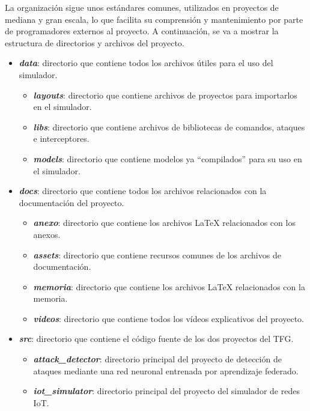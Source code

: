 La organización sigue unos estándares comunes, utilizados en proyectos de mediana y gran escala, lo que facilita su comprensión y mantenimiento por parte de programadores externos al proyecto. A continuación, se va a mostrar la estructura de directorios y archivos del proyecto.
\begin{itemize}
    \item \textit{\textbf{data}}: directorio que contiene todos los archivos útiles para el uso del simulador.
    \begin{itemize}
        \item \textit{\textbf{layouts}}: directorio que contiene archivos de proyectos para importarlos en el simulador. 
        \item \textit{\textbf{libs}}: directorio que contiene archivos de bibliotecas de comandos, ataques e interceptores.
        \item \textit{\textbf{models}}: directorio que contiene modelos ya ``compilados'' para su uso en el simulador.
    \end{itemize} 
    \item \textit{\textbf{docs}}: directorio que contiene todos los archivos relacionados con la documentación del proyecto.
    \begin{itemize}
        \item \textit{\textbf{anexo}}: directorio que contiene los archivos LaTeX relacionados con los anexos.
        \item \textit{\textbf{assets}}: directorio que contiene recursos comunes de los archivos de documentación.
        \item \textit{\textbf{memoria}}: directorio que contiene los archivos LaTeX relacionados con la memoria.
        \item \textit{\textbf{videos}}: directorio que contiene todos los vídeos explicativos del proyecto.
    \end{itemize}
    \item \textit{\textbf{src}}: directorio que contiene el código fuente de los dos proyectos del TFG.
    \begin{itemize}
        \item \textit{\textbf{attack\_detector}}: directorio principal del proyecto de detección de ataques mediante una red neuronal entrenada por aprendizaje federado.
        \item \textit{\textbf{iot\_simulator}}: directorio principal del proyecto del simulador de redes IoT.
    \end{itemize}

\end{itemize}
